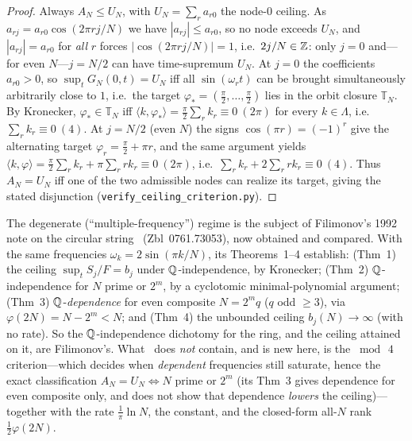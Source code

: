 \begin{proof}
Always $A_N\le U_N$, with $U_N=\sum_r a_{r0}$ the node-$0$ ceiling. As $a_{rj}=a_{r0}\cos(2\pi rj/N)$ we
have $|a_{rj}|\le a_{r0}$, so no node exceeds $U_N$, and $|a_{rj}|=a_{r0}$ for \emph{all} $r$ forces
$|\cos(2\pi rj/N)|=1$, i.e.\ $2j/N\in\mathbb{Z}$: only $j=0$ and---for even $N$---$j=N/2$ can have time-supremum $U_N$.
At $j=0$ the coefficients $a_{r0}>0$, so $\sup_t G_N(0,t)=U_N$ iff all $\sin(\omega_r t)$ can be brought
simultaneously arbitrarily close to $1$, i.e.\ the target $\varphi_\ast=(\tfrac\pi2,\dots,\tfrac\pi2)$ lies in the orbit closure
$\mathbb{T}_N$. By Kronecker, $\varphi_\ast\in\mathbb{T}_N$ iff $\langle k,\varphi_\ast\rangle=
\tfrac\pi2\sum_r k_r\equiv0\ (2\pi)$ for every $k\in\Lambda$, i.e.\ $\sum_r k_r\equiv0\ (4)$. At $j=N/2$
(even $N$) the signs $\cos(\pi r)=(-1)^r$ give the alternating target $\varphi_r=\tfrac\pi2+\pi r$, and the
same argument yields $\langle k,\varphi\rangle=\tfrac\pi2\sum_r k_r+\pi\sum_r rk_r\equiv0\ (2\pi)$, i.e.\
$\sum_r k_r+2\sum_r rk_r\equiv0\ (4)$. Thus $A_N=U_N$ iff one of the two admissible nodes can realize
its target, giving the stated disjunction (\texttt{verify\_ceiling\_criterion.py}).
\end{proof}

\begin{remark}[priority]\label{rem:f92}
The degenerate (``multiple-frequency'') regime is the subject of Filimonov's 1992 note on the circular
string~\cite{F92} (Zbl~0761.73053), now obtained and compared. With the same frequencies
$\omega_k=2\sin(\pi k/N)$, its Theorems~1--4 establish: (Thm~1) the ceiling $\sup_t S_j/F=b_j$ under
$\mathbb{Q}$-independence, by Kronecker; (Thm~2) $\mathbb{Q}$-independence for $N$ prime or $2^m$, by a cyclotomic
minimal-polynomial argument; (Thm~3) $\mathbb{Q}$-\emph{dependence} for even composite $N=2^m q$ ($q$ odd $\ge3$),
via $\varphi(2N)=N-2^m<N$; and (Thm~4) the unbounded ceiling $b_j(N)\to\infty$ (with no rate). So the
$\mathbb{Q}$-independence dichotomy for the ring, and the ceiling attained on it, are Filimonov's. What~\cite{F92}
does \emph{not} contain, and is new here, is the $\bmod\,4$ criterion---which decides when \emph{dependent}
frequencies still saturate, hence the exact classification $A_N=U_N\Leftrightarrow N$ prime or $2^m$ (its
Thm~3 gives dependence for even composite only, and does not show that dependence \emph{lowers} the
ceiling)---together with the rate $\tfrac1\pi\ln N$, the constant, and the closed-form all-$N$ rank
$\tfrac12\varphi(2N)$.
\end{remark}

